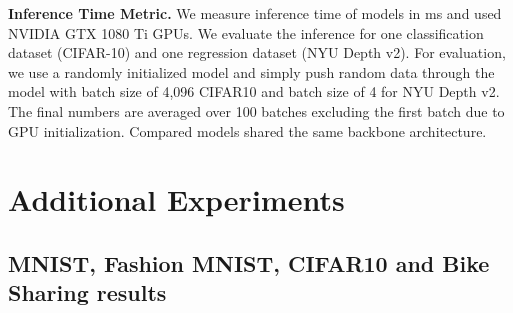 \textbf{Inference Time Metric.} We measure inference time of models in ms and used NVIDIA GTX 1080 Ti GPUs. We evaluate the inference for one classification dataset (CIFAR-10) and one regression dataset (NYU Depth v2). For evaluation, we use a randomly initialized model and simply push random data through the model with batch size of 4,096 CIFAR10 and batch size of 4 for NYU Depth v2. The final numbers are averaged over 100 batches excluding the first batch due to GPU initialization. Compared models shared the same backbone architecture.

\section{Additional Experiments}

\subsection{MNIST, Fashion MNIST, CIFAR10 and Bike Sharing results}

